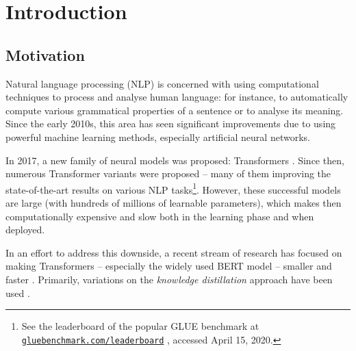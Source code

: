 \documentclass[bsc,frontabs,singlespacing,parskip,deptreport]{infthesis}
\newcommand\rurl[1]{%
  \href{https://#1}{\nolinkurl{#1}}%
}
\begin{document}
\chapter{Introduction}{
  \setcounter{page}{1}
  \section{Motivation}{
  Natural language processing (NLP) is concerned with using computational techniques to process and analyse human language: for instance, to automatically compute various grammatical properties of a sentence or to analyse its meaning.
  Since the early 2010s, this area has seen significant improvements due to using powerful machine learning methods, especially artificial neural networks.

  In 2017, a new family of neural models was proposed: Transformers \citep{Vaswani_2017}. Since then, numerous Transformer variants were proposed \citep{Radford_2018,Devlin_2018,Lan_2019,Liu_2019,Lample_2019} -- many of them improving the state-of-the-art results on various NLP tasks\footnote{See the leaderboard of the popular GLUE benchmark \citep{Wang_2018} at \rurl{gluebenchmark.com/leaderboard}, accessed April 15, 2020.}.
  However, these successful models are large (with hundreds of millions of learnable parameters), which makes then computationally expensive and slow both in the learning phase and when deployed.

  In an effort to address this downside, a recent stream of research has focused on making Transformers -- especially the widely used BERT model \citep{Devlin_2018} -- smaller and faster \citep{Michel_2019,Cheong_2019}.
  Primarily, variations on the \textit{knowledge distillation} approach \citep{Bucila_2006} have been used \citep{Sun_2019a,Mukherjee_2019,Tang_2019a,Tang_2019b,Jiao_2019,Sanh_2019}.
      
}}
\end{document}
